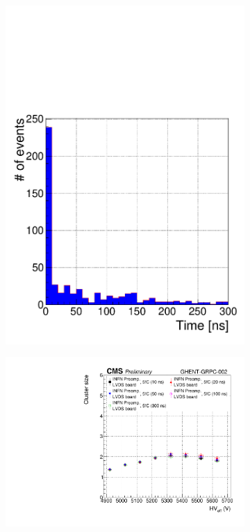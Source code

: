 	\begin{figure}[H]
		\begin{subfigure}{.5\linewidth}
		    \centering
			\includegraphics[width=\linewidth]{fig/chapt6/Muon-Avalanche-Growth-gRPC-INFN.pdf}
			\caption{\label{fig:avalanche-growth:A}}
		\end{subfigure}
		\begin{subfigure}{.5\linewidth}
		    \centering
			\includegraphics[width = \linewidth]{fig/chapt6/gRPC-INFN-LVDS-ClS-Study.pdf}

\end{subfigure}
\end{figure}
